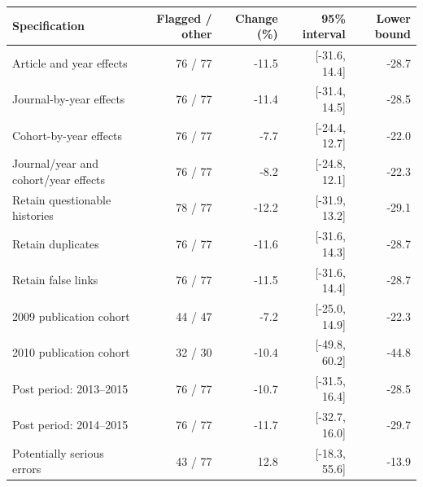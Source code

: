 \begin{tabular}{p{5.5cm}rrrr}
\toprule
Specification & Flagged / other & Change (\%) & 95\% interval & Lower bound \\
\midrule
Article and year effects & 76 / 77 & -11.5 & [-31.6, 14.4] & -28.7 \\
Journal-by-year effects & 76 / 77 & -11.4 & [-31.4, 14.5] & -28.5 \\
Cohort-by-year effects & 76 / 77 & -7.7 & [-24.4, 12.7] & -22.0 \\
Journal/year and cohort/year effects & 76 / 77 & -8.2 & [-24.8, 12.1] & -22.3 \\
Retain questionable histories & 78 / 77 & -12.2 & [-31.9, 13.2] & -29.1 \\
Retain duplicates & 76 / 77 & -11.6 & [-31.6, 14.3] & -28.7 \\
Retain false links & 76 / 77 & -11.5 & [-31.6, 14.4] & -28.7 \\
2009 publication cohort & 44 / 47 & -7.2 & [-25.0, 14.9] & -22.3 \\
2010 publication cohort & 32 / 30 & -10.4 & [-49.8, 60.2] & -44.8 \\
Post period: 2013--2015 & 76 / 77 & -10.7 & [-31.5, 16.4] & -28.5 \\
Post period: 2014--2015 & 76 / 77 & -11.7 & [-32.7, 16.0] & -29.7 \\
Potentially serious errors & 43 / 77 & 12.8 & [-18.3, 55.6] & -13.9 \\
\bottomrule
\end{tabular}
